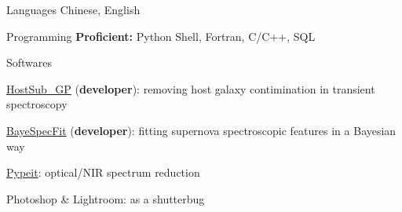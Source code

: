 


\begin{cvskills}


\cvskill
{Languages} %
{Chinese, English} %


\cvskill
{Programming} %
{{\bf\color{darktext}Proficient:} Python Shell, Fortran, C/C++, SQL} %



\cvskill
{Softwares} %
{\begin{cvitems}
    \item {\href{https://github.com/slowdivePTG/HostSub_GP}{HostSub\_GP} ({\bf\color{darktext}developer}): removing host galaxy contimination in transient spectroscopy}
    \item {\href{https://github.com/slowdivePTG/BayeSpecFit}{BayeSpecFit} ({\bf\color{darktext}developer}): fitting supernova spectroscopic features in a Bayesian way}
    \item \href{https://pypeit.readthedocs.io/en/release/}{Pypeit}: optical/NIR spectrum reduction
    \item Photoshop \& Lightroom: as a shutterbug
\end{cvitems}}%

\end{cvskills}